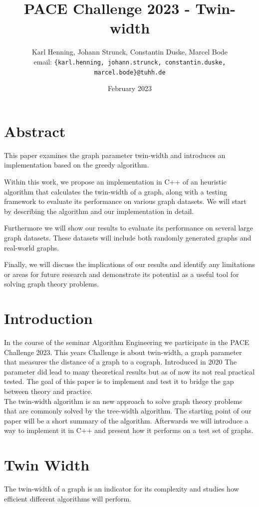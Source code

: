 \documentclass[10pt]{article}
\date{February 2023}
\title{PACE Challenge 2023 - Twin-width}
\author{
    Karl Henning, Johann Strunck, Constantin Duske, Marcel Bode\\
    email: \texttt{\{karl.henning, johann.strunck, constantin.duske, marcel.bode\}@tuhh.de}
}
\begin{document}
\maketitle{}
\section{Abstract}

This paper examines the graph parameter twin-width and introduces an implementation based on the greedy algorithm.

Within this work, we propose an implementation in C++ of an heuristic algorithm that calculates the twin-width of a graph, along with a testing framework to evaluate its performance on various graph datasets. We will start by describing the algorithm and our implementation in detail.

Furthermore we will show our results to evaluate its performance on several large graph datasets. These datasets will include both randomly generated graphs and real-world graphs.

Finally, we will discuss the implications of our results and identify any limitations or areas for future research and demonstrate its potential as a useful tool for solving graph theory problems.

\section{Introduction}


In the course of the seminar Algorithm Engineering we participate in the PACE Challenge 2023.\cite{PACE} This years
Challenge is about twin-width, a graph parameter that measures the distance of a graph to
a cograph. Introduced in 2020 The parameter did lead to many theoretical results but as
of now its not real practical tested. \cite{Bonnet2020,Hlineny2022,Jacob2022} The goal of this paper is to implement and test it to bridge
the gap between theory and practice.\\ The twin-width algorithm is an new approach to
solve graph theory problems that are commonly solved by the tree-width algorithm. The
starting point of our paper will be a short summary of the algorithm. Afterwards we will
introduce a way to implement it in C++ and present how it performs on a test set of graphs.

\section{Twin Width}
The twin-width of a graph is an indicator for its complexity and studies how efficient
different algorithms will perform.
\end{document}
